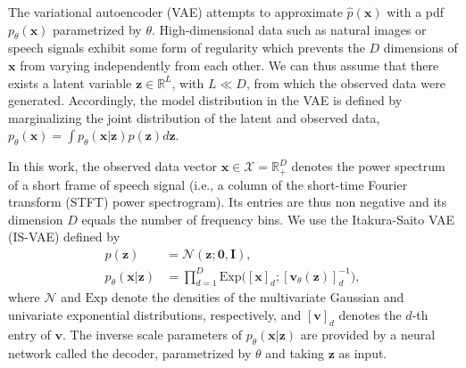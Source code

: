 \documentclass[review]{elsarticle}
\begin{document}
The variational autoencoder (VAE) \citep{kingma2014auto, rezende2014stochastic} attempts to approximate $\hat{p}(\mathbf{x})$ with a pdf $p_\theta(\mathbf{x})$ parametrized by $\theta$. High-dimensional data such as natural images or speech signals exhibit some form of regularity which prevents the $D$ dimensions of $\mathbf{x}$ from varying independently from each other. We can thus assume that there exists a latent variable $\mathbf{z} \in \mathbb{R}^L$, with $L \ll D$, from which the observed data were generated. Accordingly, the model distribution in the VAE is defined by marginalizing the joint distribution of the latent and observed data, $p_\theta(\mathbf{x}) = \int p_\theta(\mathbf{x} | \mathbf{z}) p(\mathbf{z}) d\mathbf{z}$.

In this work, the observed data vector $\mathbf{x} \in \mathcal{X} = \mathbb{R}_+^D$ denotes the power spectrum of a short frame of speech signal (i.e., a column of the short-time Fourier transform (STFT) power spectrogram). Its entries are thus non negative and its dimension $D$ equals the number of frequency bins. We use the Itakura-Saito VAE (IS-VAE) \citep{bando2018statistical,leglaive_MLSP18, girin2019} defined by
\begin{align}
    p(\mathbf{z}) &= \mathcal{N}(\mathbf{z}; \mathbf{0}, \mathbf{I}), \\ 
    p_\theta(\mathbf{x} | \mathbf{z}) &= \prod\limits_{d=1}^{D} \text{Exp}\Big( [\mathbf{x}]_d ; [\mathbf{v}_\theta(\mathbf{z})]_d^{-1} \Big), \label{vae_gen_dist}
\end{align}
where $\mathcal{N}$ and $\text{Exp}$ denote the densities of the multivariate Gaussian and univariate exponential distributions, respectively, and $[\mathbf{v}]_d$ denotes the $d$-th entry of $\mathbf{v}$. The inverse scale parameters of $p_\theta(\mathbf{x} | \mathbf{z})$ are provided by a neural network called the decoder, parametrized by $\theta$ and taking $\mathbf{z}$ as input.
\end{document}
